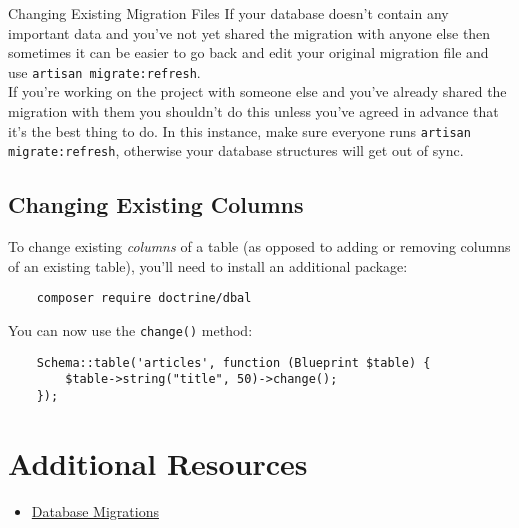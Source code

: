 \begin{infobox}{Changing Existing Migration Files}
    If your database doesn't contain any important data and you've not yet shared the migration with anyone else then sometimes it can be easier to go back and edit your original migration file and use \texttt{artisan migrate:refresh}.
    \\

    If you're working on the project with someone else and you've already shared the migration with them you shouldn't do this unless you've agreed in advance that it's the best thing to do. In this instance, make sure everyone runs \texttt{artisan migrate:refresh}, otherwise your database structures will get out of sync.
\end{infobox}


\pagebreak

\subsection{Changing Existing Columns}

To change existing \textit{columns} of a table (as opposed to adding or removing columns of an existing table), you'll need to install an additional package:

\begin{verbatim}
    composer require doctrine/dbal
\end{verbatim}

You can now use the \texttt{change()} method:

\begin{verbatim}
    Schema::table('articles', function (Blueprint $table) {
        $table->string("title", 50)->change();
    });
\end{verbatim}



\section{Additional Resources}

\begin{itemize}[leftmargin=*]
    \item \href{http://laravel.com/docs/master/migrations}{Database Migrations}
\end{itemize}
